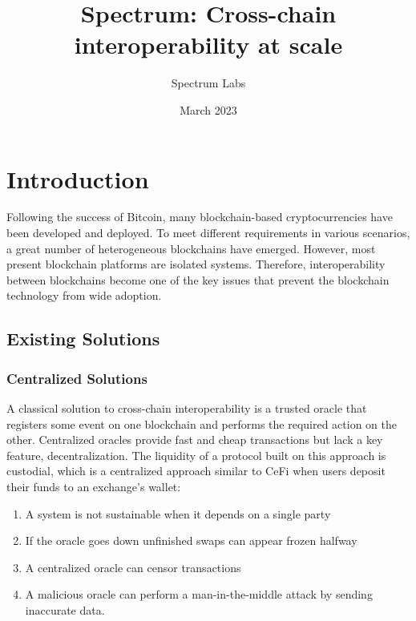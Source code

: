 \documentclass{article}
\title{Spectrum: Cross-chain interoperability at scale}
\author{Spectrum Labs}
\date{March 2023}
\begin{document}
    \begin{sloppypar}

        \maketitle


        \section{Introduction}\label{sec:introduction}

        Following the success of Bitcoin, many blockchain-based cryptocurrencies have been developed and deployed.
        To meet different requirements in various scenarios, a great number of heterogeneous blockchains have emerged.
        However, most present blockchain platforms are isolated systems.
        Therefore, interoperability between blockchains become one of the key issues
        that prevent the blockchain technology from wide adoption.

        \subsection{Existing Solutions}\label{subsec:existing-solutions}

        \subsubsection{Centralized Solutions}\label{subsubsec:centralized-solutions}

        A classical solution to cross-chain interoperability is a trusted oracle that registers some event on one blockchain and performs the required action on the other.
        Centralized oracles provide fast and cheap transactions but lack a key feature, decentralization.
        The liquidity of a protocol built on this approach is custodial, which is a centralized approach similar to CeFi when users deposit their funds to an exchange's wallet:
        \begin{enumerate}
            \item A system is not sustainable when it depends on a single party
            \item If the oracle goes down unfinished swaps can appear frozen halfway
            \item A centralized oracle can censor transactions
            \item A malicious oracle can perform a man-in-the-middle attack by sending inaccurate data.
        \end{enumerate}


\end{sloppypar}
\end{document}
